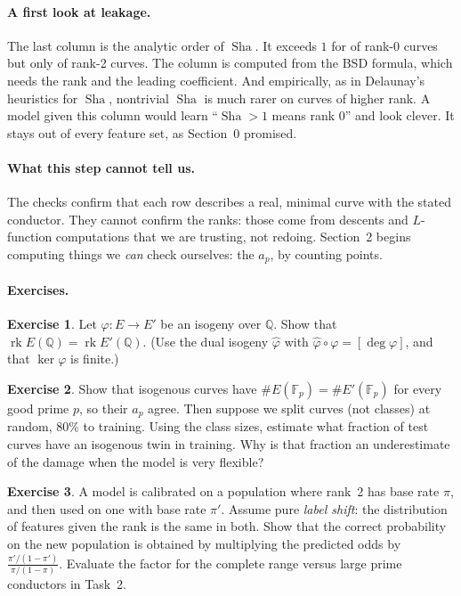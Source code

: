 \documentclass[11pt]{article}
\theoremstyle{definition}
\newtheorem{exercise}{Exercise}[section]
\theoremstyle{plain}
\theoremstyle{remark}
\newcommand{\Q}{\mathbb{Q}}
\newcommand{\F}{\mathbb{F}}
\renewcommand{\_}{\oldunderscore\allowbreak}
\DeclareMathOperator{\rk}{rk}
\DeclareMathOperator{\Sha}{Sha}
\begin{document}
\paragraph{A first look at leakage.}
The last column is the analytic order of $\Sha$. It exceeds $1$ for \ShaBigRankZero{} of
rank-0 curves but only \ShaBigRankTwo{} of rank-2 curves. The column is computed from the
BSD formula, which needs the rank and the leading coefficient. And empirically, as in
Delaunay's heuristics for $\Sha$, nontrivial $\Sha$ is much rarer on curves of higher rank. A model given this column would learn ``$\Sha>1$ means rank 0''
and look clever. It stays out of every feature set, as Section~0 promised.

\paragraph{What this step cannot tell us.}
The checks confirm that each row describes a real, minimal curve with the stated conductor.
They cannot confirm the ranks: those come from descents and $L$-function computations that we
are trusting, not redoing. Section~2 begins computing things we \emph{can} check ourselves:
the $a_p$, by counting points.

\paragraph{Exercises.}
\begin{exercise}\label{ex:isogeny-rank}
Let $\varphi:E\to E'$ be an isogeny over $\Q$. Show that $\rk E(\Q)=\rk E'(\Q)$. (Use the dual
isogeny $\hat\varphi$ with $\hat\varphi\circ\varphi=[\deg\varphi]$, and that $\ker\varphi$ is finite.)
\end{exercise}
\begin{exercise}\label{ex:isogeny-ap}
Show that isogenous curves have $\#E(\F_p)=\#E'(\F_p)$ for every good prime $p$, so their
$a_p$ agree. Then suppose we split curves (not classes) at random, 80\% to training. Using the
class sizes, estimate what fraction of test curves have an isogenous twin in training. Why is
that fraction an underestimate of the damage when the model is very flexible?
\end{exercise}
\begin{exercise}\label{ex:label-shift}
A model is calibrated on a population where rank~2 has base rate $\pi$, and then used on one
with base rate $\pi'$. Assume pure \emph{label shift}: the distribution of features given the
rank is the same in both. Show that the correct probability on the new population is
obtained by multiplying the predicted odds by $\frac{\pi'/(1-\pi')}{\pi/(1-\pi)}$. Evaluate the
factor for the complete range versus large prime conductors in Task~2.
\end{exercise}
\end{document}
